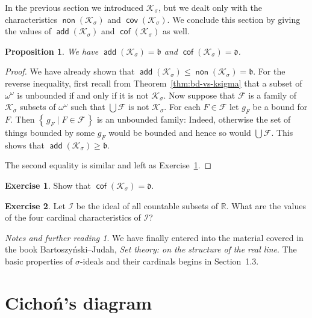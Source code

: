 \documentclass[11pt,oneside]{amsbook}
\newcommand{\set}[1]{\left\{\,#1\,\right\}}
\newcommand{\R}{\mathbb R}
\newcommand{\Ksigma}{\mathcal K_\sigma}
\DeclareMathOperator{\add}{\mathsf{add}}
\DeclareMathOperator{\non}{\mathsf{non}}
\DeclareMathOperator{\cov}{\mathsf{cov}}
\DeclareMathOperator{\cof}{\mathsf{cof}}
\theoremstyle{definition}
\newtheorem{exercise}{Exercise}[section]
\theoremstyle{plain}
\newtheorem{proposition}[theorem]{Proposition}
\theoremstyle{definition}
\theoremstyle{remark}
\newtheorem*{notes}{Notes and further reading}
\numberwithin{equation}{section}
\numberwithin{figure}{section}
\begin{document}
In the previous section we introduced $\Ksigma$, but we dealt only with the characteristics $\non(\Ksigma)$ and $\cov(\Ksigma)$. We conclude this section by giving the values of $\add(\Ksigma)$ and $\cof(\Ksigma)$ as well.

\begin{proposition}
  We have $\add(\Ksigma)=\mathfrak b$ and $\cof(\Ksigma)=\mathfrak d$.
\end{proposition}

\begin{proof}
  We have already shown that $\add(\Ksigma)\leq\non(\Ksigma)=\mathfrak b$. For the reverse inequality, first recall from Theorem~\ref{thm:bd-vs-ksigma} that a subset of $\omega^\omega$ is unbounded if and only if it is not $\Ksigma$. Now suppose that $\mathcal F$ is a family of $\Ksigma$ subsets of $\omega^\omega$ such that $\bigcup\mathcal F$ is not $\Ksigma$. For each $F\in\mathcal F$ let $g_F$ be a bound for $F$. Then $\set{g_F\mid F\in\mathcal F}$ is an unbounded family: Indeed, otherwise the set of things bounded by some $g_F$ would be bounded and hence so would $\bigcup\mathcal F$. This shows that $\add(\Ksigma)\geq\mathfrak b$.

The second equality is similar and left as Exercise~\ref{exerc:non-ksigma-d}.
\end{proof}

\begin{exercise}
  \label{exerc:non-ksigma-d}
  Show that $\cof(\Ksigma)=\mathfrak d$.
\end{exercise}

\begin{exercise}
  Let $\mathcal I$ be the ideal of all countable subsets of $\R$. What are the values of the four cardinal characteristics of $\mathcal I$?
\end{exercise}

\begin{notes}
  We have finally entered into the material covered in the book Bartoszy\'nski--Judah, \emph{Set theory: on the structure of the real line}. The basic properties of $\sigma$-ideals and their cardinals begins in Section~1.3.
\end{notes}


\newpage
\section{Cicho\'n's diagram}
\end{document}
